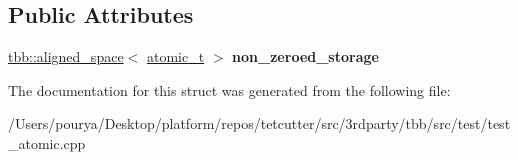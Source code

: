 \subsection*{Public Attributes}
\begin{DoxyCompactItemize}
\item 
\hypertarget{structinitialization__tests_1_1test__initialization__fixture_aebc89acc5bfbf7f4323a2dcd8827d84d}{}\hyperlink{classtbb_1_1aligned__space}{tbb\+::aligned\+\_\+space}$<$ \hyperlink{structtbb_1_1atomic}{atomic\+\_\+t} $>$ {\bfseries non\+\_\+zeroed\+\_\+storage}\label{structinitialization__tests_1_1test__initialization__fixture_aebc89acc5bfbf7f4323a2dcd8827d84d}

\end{DoxyCompactItemize}


The documentation for this struct was generated from the following file\+:\begin{DoxyCompactItemize}
\item 
/\+Users/pourya/\+Desktop/platform/repos/tetcutter/src/3rdparty/tbb/src/test/test\+\_\+atomic.\+cpp\end{DoxyCompactItemize}
